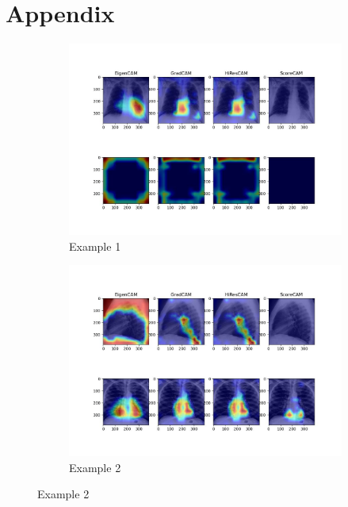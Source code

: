 \documentclass[11pt]{article}
\begin{document}
            \section{Appendix}


        \begin{figure}[H]
                 \centering
                 \begin{subfigure}[b]{0.45\textwidth}
                     \centering
                     \includegraphics[width=\textwidth]{CheXpert2/inference/heatmaps_0.jpg}
                     \caption{Example 1}
                     \vspace{4ex}

                 \end{subfigure}
                 \hfill
                 \begin{subfigure}[b]{0.45\textwidth}
                     \centering
                     \includegraphics[width=\textwidth]{CheXpert2/inference/heatmaps_1.jpg}
                     \caption{Example 2}
                     \vspace{4ex}


\end{subfigure}
\end{figure}
\end{document}
